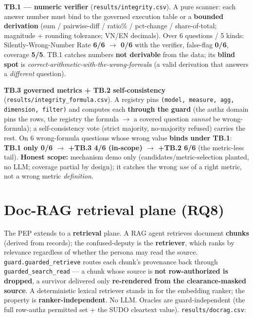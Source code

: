 \documentclass[runningheads]{llncs}
\newcommand{\code}[1]{\texttt{#1}}
\begin{document}
\textbf{TB.1 --- numeric verifier} (\code{results/integrity.csv}). A pure scanner: each answer number must bind
to the governed execution table or a \textbf{bounded derivation} (sum / pairwise-diff / ratio\% / pct-change /
share-of-total; magnitude + rounding tolerance; VN/EN decimals). Over 6 questions / 5 kinds: Silently-Wrong-Number
Rate \textbf{6/6 $\to$ 0/6} with the verifier, false-flag \textbf{0/6}, coverage \textbf{5/5}. TB.1 catches
numbers \textbf{not derivable} from the data; its \textbf{blind spot} is
\emph{correct-arithmetic-with-the-wrong-formula} (a valid derivation that answers a \emph{different} question).

\textbf{TB.3 governed metrics + TB.2 self-consistency} (\code{results/integrity_formula.csv}). A registry pins
\code{(model, measure, agg, dimension, filter)} and computes each \textbf{through the guard} (the authz domain
pins the rows, the registry the formula $\to$ a covered question \emph{cannot} be wrong-formula); a self-consistency
vote (strict majority, no-majority refused) carries the rest. On 6 wrong-formula questions whose wrong value
\textbf{binds under TB.1}: \textbf{TB.1 only 0/6 $\to$ +TB.3 4/6 (in-scope) $\to$ +TB.2 6/6} (the metric-less tail).
\textbf{Honest scope:} mechanism demo only (candidates/metric-selection planted, no LLM; coverage partial by
design); it catches the wrong \emph{use} of a right metric, not a wrong metric \emph{definition}.

\section{Doc-RAG retrieval plane (RQ8)}
The PEP extends to a \textbf{retrieval} plane. A RAG agent retrieves document \textbf{chunks} (derived from
records); the confused-deputy is the \textbf{retriever}, which ranks by relevance regardless of whether the
persona may read the source. \code{guard.guarded_retrieve} routes each chunk's provenance back through
\code{guarded_search_read} --- a chunk whose source is \textbf{not row-authorized is dropped}, a survivor delivered
only \textbf{re-rendered from the clearance-masked source}. A deterministic lexical retriever stands in for the
embedding ranker; the property is \textbf{ranker-independent}. No LLM. Oracles are guard-independent (the full
row-authz permitted set + the SUDO cleartext value). \code{results/docrag.csv}:
\end{document}
